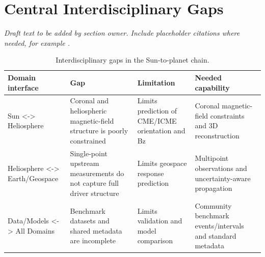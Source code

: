 \documentclass[
  draft
]{agujournal2025}
\begin{document}
\section{Central Interdisciplinary Gaps}

\noindent\textit{Draft text to be added by section owner. Include placeholder citations where needed, for example \cite{placeholder-roadmap}.}

\begin{table}[h]
\caption{Interdisciplinary gaps in the Sun-to-planet chain.}
\label{tab:interdisciplinary-gaps}
\centering
\begin{tabular}{p{} p{} p{} p{}}
\hline
Domain interface & Gap & Limitation & Needed capability \\
\hline
Sun <-> Heliosphere & Coronal and heliospheric magnetic-field structure is poorly constrained & Limits prediction of CME/ICME orientation and Bz & Coronal magnetic-field constraints and 3D reconstruction \\
Heliosphere <-> Earth/Geospace & Single-point upstream measurements do not capture full driver structure & Limits geospace response prediction & Multipoint observations and uncertainty-aware propagation \\
Data/Models <-> All Domains & Benchmark datasets and shared metadata are incomplete & Limits validation and model comparison & Community benchmark events/intervals and standard metadata \\
\hline
\end{tabular}
\end{table}
\end{document}
